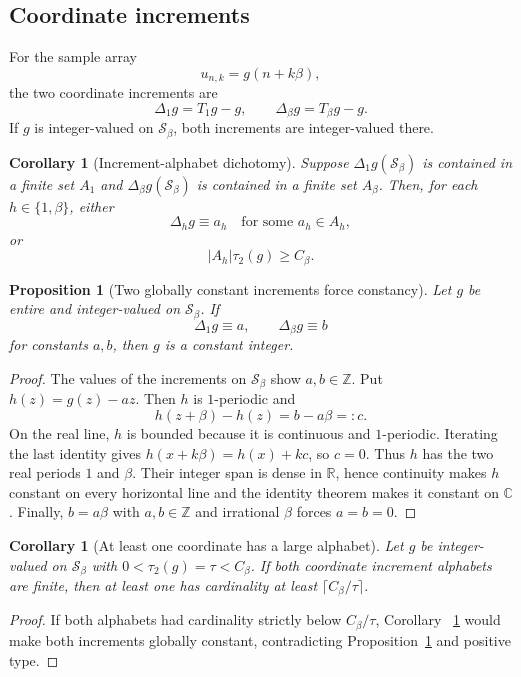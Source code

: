 \documentclass[11pt,oneside]{article}
\newtheorem{proposition}[theorem]{Proposition}
\newtheorem{corollary}[theorem]{Corollary}
\theoremstyle{definition}
\theoremstyle{remark}
\newcommand{\Z}{\mathbb Z}
\newcommand{\R}{\mathbb R}
\newcommand{\C}{\mathbb C}
\newcommand{\Sbeta}{\mathcal S_\beta}
\newcommand{\Cbeta}{C_\beta}
\newcommand{\Tsh}[1]{T_{#1}}
\newcommand{\Del}[1]{\Delta_{#1}}
\begin{document}
\subsection{Coordinate increments}

For the sample array
\[
 u_{n,k}=g(n+k\beta),
\]
the two coordinate increments are
\[
 \Del{1}g=\Tsh{1}g-g,
 \qquad
 \Del{\beta}g=\Tsh{\beta}g-g.
\]
If $g$ is integer-valued on $\Sbeta$, both increments are integer-valued there.

\begin{corollary}[Increment-alphabet dichotomy]
\label{cor:incrementalphabet}
Suppose $\Del{1}g(\Sbeta)$ is contained in a finite set $A_1$ and
$\Del{\beta}g(\Sbeta)$ is contained in a finite set $A_\beta$.  Then, for each
$h\in\{1,\beta\}$, either
\[
 \Del{h}g\equiv a_h\quad\text{for some }a_h\in A_h,
\]
or
\[
 |A_h|\tau_2(g)\ge\Cbeta.
\]
\end{corollary}

\begin{proposition}[Two globally constant increments force constancy]
\label{prop:twoconstantincrements}
Let $g$ be entire and integer-valued on $\Sbeta$.  If
\[
 \Del{1}g\equiv a,
 \qquad
 \Del{\beta}g\equiv b
\]
for constants $a,b$, then $g$ is a constant integer.
\end{proposition}

\begin{proof}
The values of the increments on $\Sbeta$ show $a,b\in\Z$.  Put $h(z)=g(z)-az$.
Then $h$ is $1$-periodic and
\[
 h(z+\beta)-h(z)=b-a\beta=:c.
\]
On the real line, $h$ is bounded because it is continuous and $1$-periodic.  Iterating the
last identity gives $h(x+k\beta)=h(x)+kc$, so $c=0$.  Thus $h$ has the two real periods
$1$ and $\beta$.  Their integer span is dense in $\R$, hence continuity makes $h$ constant
on every horizontal line and the identity theorem makes it constant on $\C$.  Finally,
$b=a\beta$ with $a,b\in\Z$ and irrational $\beta$ forces $a=b=0$.
\end{proof}

\begin{corollary}[At least one coordinate has a large alphabet]
\label{cor:oneaxislarge}
Let $g$ be integer-valued on $\Sbeta$ with $0<\tau_2(g)=\tau<\Cbeta$.  If both coordinate
increment alphabets are finite, then at least one has cardinality at least
$\lceil\Cbeta/\tau\rceil$.
\end{corollary}

\begin{proof}
If both alphabets had cardinality strictly below $\Cbeta/\tau$, Corollary
~\ref{cor:incrementalphabet} would make both increments globally constant, contradicting
Proposition~\ref{prop:twoconstantincrements} and positive type.
\end{proof}
\end{document}
